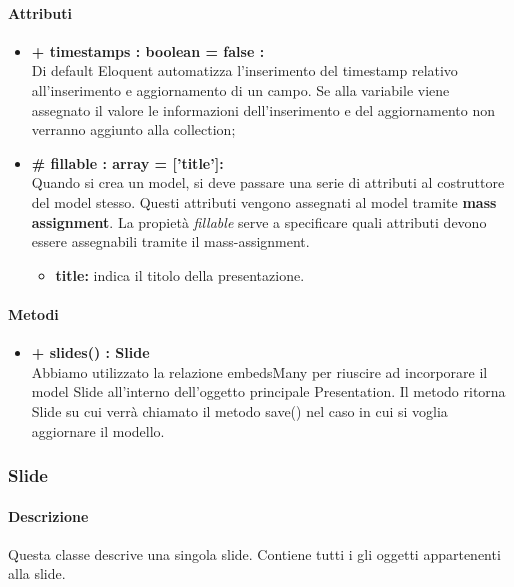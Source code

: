 	\paragraph{Attributi}
	\begin{itemize}
		\item \textbf{+ timestamps : boolean = false :}\\
		Di default Eloquent automatizza l'inserimento del timestamp relativo all'inserimento e aggiornamento di un campo. Se alla variabile viene assegnato il valore le informazioni dell'inserimento e del aggiornamento non verranno aggiunto alla collection;
		\item \textbf{\# fillable : array = ['title']:}\\
		Quando si crea un model, si deve passare una serie di attributi al costruttore del model stesso. Questi attributi vengono assegnati al model tramite \textbf{mass assignment}. La propietà \textit{fillable} serve a specificare quali attributi devono essere assegnabili tramite il mass-assignment.
		\begin{itemize}
			\item \textbf{title:} indica il titolo della presentazione.
		\end{itemize}
	\end{itemize}

	\paragraph{Metodi}
	\begin{itemize}
		\item \textbf{+ slides() : Slide}\\
		Abbiamo utilizzato la relazione embedsMany per riuscire ad incorporare il model Slide all’interno dell’oggetto principale Presentation. Il metodo ritorna Slide su cui verrà chiamato il metodo save() nel caso in cui si voglia aggiornare il modello.
	\end{itemize}
\newpage


\subsubsection{Slide}


	\paragraph{Descrizione}
	Questa classe descrive una singola slide. Contiene tutti i gli oggetti appartenenti alla slide.
	
